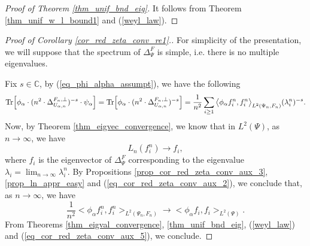 \documentclass[12pt]{article}
\numberwithin{equation}{section}
\theoremstyle{theorem}
\theoremstyle{definition}
\theoremstyle{remark}
\newcommand{\comp}{\mathbb{C}}
\newcommand{\laplcomp}{\Delta}
\newcommand{\scal}[2]{\big< #1, #2 \big>}
\begin{document}
	\begin{proof}[Proof of Theorem \ref{thm_unif_bnd_eig}]
		It follows from Theorem \ref{thm_unif_w_l_bound1} and (\ref{weyl_law}).
	\end{proof}
	\begin{proof}[Proof of  Corollary \ref{cor_red_zeta_conv_re1}.]
		For simplicity of the presentation, we will suppose that the spectrum of $\laplcomp_{\Psi}^{F}$ is simple, i.e. there is no multiple eigenvalues.
		\par 
		Fix $s \in \comp$, by (\ref{eq_phi_alpha_assumpt}), we have the following
		\begin{equation}\label{eq_cor_red_zeta_conv_aux_1}
			{\rm{Tr}} \Big[  \phi_{\alpha} \cdot (n^2 \cdot  \laplcomp_{U_{\alpha, n}}^{F_n, \perp})^{-s} \cdot \psi_{\alpha} \Big] 
			=
			{\rm{Tr}} \Big[  \phi_{\alpha} \cdot (n^2 \cdot  \laplcomp_{U_{\alpha, n}}^{F_n, \perp})^{-s} \Big]
			=
			\frac{1}{n^2}
			\sum_{i \geq 1} 
			 \scal{\phi_{\alpha} f_i^{n}}{f_i^{n}}_{L^2(\Psi_n, F_n)} (\lambda_i^{n})^{-s}.
		\end{equation}
		Now, by Theorem \ref{thm_eigvec_convergence}, we know that in $L^2(\Psi)$, as $n \to \infty$, we have
		\begin{equation}\label{eq_cor_red_zeta_conv_aux_2}
			L_n(f_i^{n}) \to f_i,
		\end{equation}
		where $f_i$ is the eigenvector of $\laplcomp_{\Psi}^{F}$ corresponding to the eigenvalue $\lambda_i = \lim_{n \to \infty} \lambda_i^{n}$.
		By Propositions \ref{prop_cor_red_zeta_conv_aux_3}, \ref{prop_ln_appr_easy} and (\ref{eq_cor_red_zeta_conv_aux_2}), we conclude that, as $n \to \infty$, we have
	\begin{equation}\label{eq_cor_red_zeta_conv_aux_5}
			\frac{1}{n^2}
			 \scal{\phi_{\alpha} f_i^{n}}{f_i^{n}}_{L^2(\Psi_n, F_n)}
			 \to
			 \scal{\phi_{\alpha}  f_i }{f_i }_{L^2(\Psi)}.
		\end{equation}
		From Theorems \ref{thm_eigval_convergence}, \ref{thm_unif_bnd_eig}, (\ref{weyl_law}) and (\ref{eq_cor_red_zeta_conv_aux_5}), we conclude.
	\end{proof}
\end{document}
